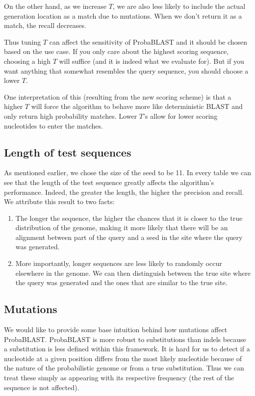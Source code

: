 \documentclass[11pt]{IEEEtran}
\begin{document}
On the other hand, as we increase $T$, we are also less likely to include the actual generation location as a match due to mutations. When we don't return it as a match, the recall decreases. 

Thus tuning $T$ can affect the sensitivity of ProbaBLAST and it should be chosen based on the use case. If you only care about the highest scoring sequence, choosing a high $T$ will suffice (and it is indeed what we evaluate for). But if you want anything that somewhat resembles the query sequence, you should choose a lower $T$. 

One interpretation of this (resulting from the new scoring scheme) is that a higher $T$ will force the algorithm to behave more like deterministic BLAST and only return high probability matches. Lower $T$'s allow for lower scoring nucleotides to enter the matches.

\subsection{Length of test sequences}
As mentioned earlier, we chose the size of the seed to be 11. In every table we can see that the length of the test sequence greatly affects the algorithm's performance. Indeed, the greater the length, the higher the precision and recall. We attribute this result to two facts:
\begin{enumerate}
\item The longer the sequence, the higher the chances that it is closer to the true distribution of the genome, making it more likely that there will be an alignment between part of the query and a seed in the site where the query was generated.
\item More importantly, longer sequences are less likely to randomly occur elsewhere in the genome. We can then distinguish between the true site where the query was generated and the ones that are similar to the true site.
\end{enumerate}


\subsection{Mutations}
We would like to provide some base intuition behind how mutations affect ProbaBLAST. 
ProbaBLAST is more robust to substitutions than indels because a substitution is less defined within this framework. It is hard for us to detect if a nucleotide at a given position differs from the most likely nucleotide because of the nature of the probabilistic genome or from a true substitution. Thus we can treat these simply as appearing with its respective frequency (the rest of the sequence is not affected). 
\end{document}
